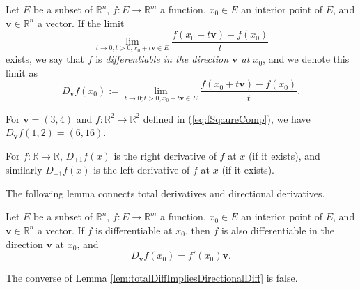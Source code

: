 \begin{defn}
  \label{def:directionalDerivative}
  Let $E$ be a subset of $\mathbb{R}^n$,
  $f: E\rightarrow \mathbb{R}^m$ a function,
  $x_0\in E$ an interior point of $E$,
  and $\mathbf{v}\in \mathbb{R}^n$ a vector.
  If the limit
  \begin{displaymath}
    \lim_{t\rightarrow 0; t>0, x_0+t\mathbf{v}\in E} \frac{f(x_0+t\mathbf{v}) - f(x_0)}{t}
  \end{displaymath}
  exists, we say that $f$ is \emph{differentiable in the direction $\mathbf{v}$
    at $x_0$},
  and we denote this limit as
  \begin{equation}
    \label{eq:directionalDerivative}
    D_\mathbf{v} f(x_0) := \lim_{t\rightarrow 0; t>0, x_0+t\mathbf{v}\in E}
    \frac{f(x_0+t\mathbf{v}) - f(x_0)}{t}.
  \end{equation}
\end{defn}

\begin{exm}
  For $\mathbf{v}=(3,4)$ and $f: \mathbb{R}^2\rightarrow\mathbb{R}^2$ defined in
  (\ref{eq:fSqaureComp}),
  we have $D_{\mathbf{v}}f(1,2)=(6,16)$.
\end{exm}

\begin{exm}
  For $f: \mathbb{R}\rightarrow\mathbb{R}$,
  $D_{+1} f(x)$ is the right derivative of $f$ at $x$ (if it exists),
  and similarly $D_{-1}f(x)$ is the left derivative of $f$ at $x$ (if it exists).
\end{exm}

\begin{rem}
  The following lemma connects total derivatives and directional derivatives.
\end{rem}

\begin{lem}
  \label{lem:totalDiffImpliesDirectionalDiff}
  Let $E$ be a subset of $\mathbb{R}^n$,
  $f: E\rightarrow \mathbb{R}^m$ a function,
  $x_0\in E$ an interior point of $E$,
  and $\mathbf{v}\in \mathbb{R}^n$ a vector.
  If $f$ is differentiable at $x_0$,
  then $f$ is also differentiable in the direction $\mathbf{v}$ at $x_0$, and
  \begin{equation}
    \label{eq:totalDiffImpliesDirectionalDiff}
    D_\mathbf{v} f(x_0) = f'(x_0) \mathbf{v}.
  \end{equation}
\end{lem}

\begin{rem}
  The converse of Lemma \ref{lem:totalDiffImpliesDirectionalDiff} is
  false.
\end{rem}

